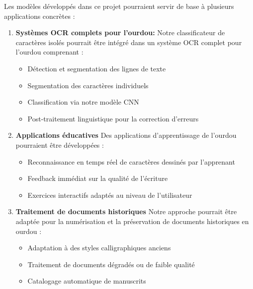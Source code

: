 \begin{flushleft}
Les modèles développés dans ce projet pourraient servir de base à plusieurs applications concrètes :

\begin{enumerate}
\item \textbf{Systèmes OCR complets pour l'ourdou: }
Notre classificateur de caractères isolés pourrait être intégré dans un système OCR complet pour l'ourdou comprenant :
\begin{itemize}
\item Détection et segmentation des lignes de texte
\item Segmentation des caractères individuels
\item Classification via notre modèle CNN
\item Post-traitement linguistique pour la correction d'erreurs
\end{itemize}
\item \textbf{Applications éducatives}
Des applications d'apprentissage de l'ourdou pourraient être développées :
\begin{itemize}
\item Reconnaissance en temps réel de caractères dessinés par l'apprenant
\item Feedback immédiat sur la qualité de l'écriture
\item Exercices interactifs adaptés au niveau de l'utilisateur
\end{itemize}
\item \textbf{Traitement de documents historiques}
Notre approche pourrait être adaptée pour la numérisation et la préservation de documents historiques en ourdou :
\begin{itemize}
\item Adaptation à des styles calligraphiques anciens
\item Traitement de documents dégradés ou de faible qualité
\item Catalogage automatique de manuscrits
\end{itemize}
\end{enumerate}
\end{flushleft}